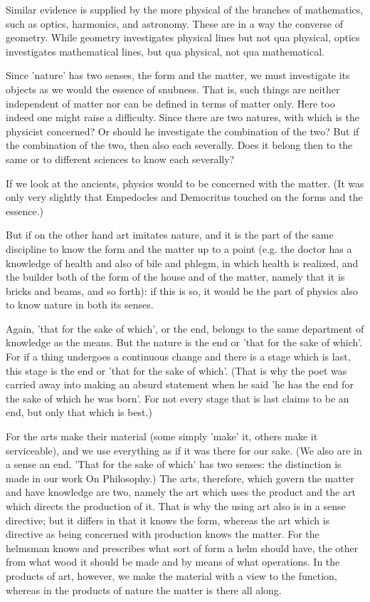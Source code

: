 Similar evidence is supplied by the more physical of the branches
of mathematics, such as optics, harmonics, and astronomy. These are
in a way the converse of geometry. While geometry investigates physical
lines but not qua physical, optics investigates mathematical lines,
but qua physical, not qua mathematical. 

Since 'nature' has two senses, the form and the matter, we must investigate
its objects as we would the essence of snubness. That is, such things
are neither independent of matter nor can be defined in terms of matter
only. Here too indeed one might raise a difficulty. Since there are
two natures, with which is the physicist concerned? Or should he investigate
the combination of the two? But if the combination of the two, then
also each severally. Does it belong then to the same or to different
sciences to know each severally? 

If we look at the ancients, physics would to be concerned with the
matter. (It was only very slightly that Empedocles and Democritus
touched on the forms and the essence.) 

But if on the other hand art imitates nature, and it is the part of
the same discipline to know the form and the matter up to a point
(e.g. the doctor has a knowledge of health and also of bile and phlegm,
in which health is realized, and the builder both of the form of the
house and of the matter, namely that it is bricks and beams, and so
forth): if this is so, it would be the part of physics also to know
nature in both its senses. 

Again, 'that for the sake of which', or the end, belongs to the same
department of knowledge as the means. But the nature is the end or
'that for the sake of which'. For if a thing undergoes a continuous
change and there is a stage which is last, this stage is the end or
'that for the sake of which'. (That is why the poet was carried away
into making an absurd statement when he said 'he has the end for the
sake of which he was born'. For not every stage that is last claims
to be an end, but only that which is best.) 

For the arts make their material (some simply 'make' it, others make
it serviceable), and we use everything as if it was there for our
sake. (We also are in a sense an end. 'That for the sake of which'
has two senses: the distinction is made in our work On Philosophy.)
The arts, therefore, which govern the matter and have knowledge are
two, namely the art which uses the product and the art which directs
the production of it. That is why the using art also is in a sense
directive; but it differs in that it knows the form, whereas the art
which is directive as being concerned with production knows the matter.
For the helmsman knows and prescribes what sort of form a helm should
have, the other from what wood it should be made and by means of what
operations. In the products of art, however, we make the material
with a view to the function, whereas in the products of nature the
matter is there all along. 

